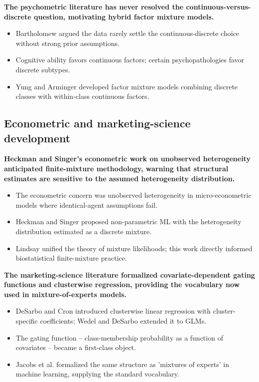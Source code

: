 \documentclass[
  11pt,
]{article}
\begin{document}
\textbf{The psychometric literature has never resolved the
continuous-versus-discrete question, motivating hybrid factor mixture
models.}

\begin{itemize}\setlength{\itemsep}{2pt}\setlength{\parskip}{0pt}
\item Bartholomew argued the data rarely settle the continuous-discrete
  choice without strong prior assumptions.
\item Cognitive ability favors continuous factors; certain
  psychopathologies favor discrete subtypes.
\item Yung and Arminger developed factor mixture models combining
  discrete classes with within-class continuous factors.
\end{itemize}

\subsection{Econometric and marketing-science development}\label{econometric-and-marketing-science-development}

\textbf{Heckman and Singer's econometric work on unobserved
heterogeneity anticipated finite-mixture methodology, warning that
structural estimates are sensitive to the assumed heterogeneity
distribution.}

\begin{itemize}\setlength{\itemsep}{2pt}\setlength{\parskip}{0pt}
\item The econometric concern was unobserved heterogeneity in
  micro-econometric models where identical-agent assumptions fail.
\item Heckman and Singer proposed non-parametric ML with the
  heterogeneity distribution estimated as a discrete mixture.
\item Lindsay unified the theory of mixture likelihoods; this work
  directly informed biostatistical finite-mixture practice.
\end{itemize}

\textbf{The marketing-science literature formalized covariate-dependent
gating functions and clusterwise regression, providing the vocabulary
now used in mixture-of-experts models.}

\begin{itemize}\setlength{\itemsep}{2pt}\setlength{\parskip}{0pt}
\item DeSarbo and Cron introduced clusterwise linear regression with
  cluster-specific coefficients; Wedel and DeSarbo extended it to GLMs.
\item The gating function -- class-membership probability as a function
  of covariates -- became a first-class object.
\item Jacobs et al. formalized the same structure as 'mixtures of
  experts' in machine learning, supplying the standard vocabulary.
\end{itemize}
\end{document}
